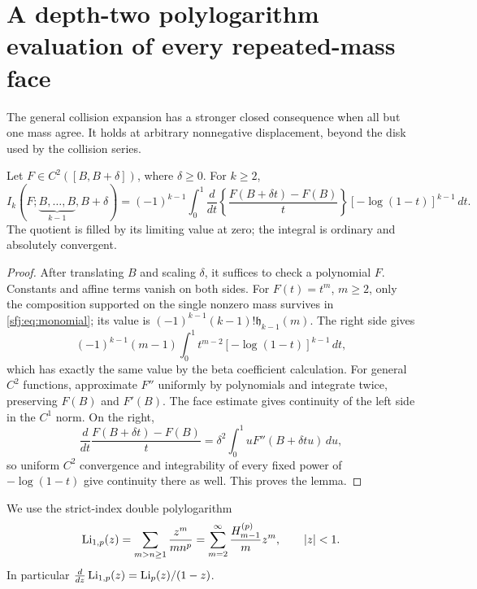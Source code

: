 \section{A depth-two polylogarithm evaluation of every repeated-mass face}
\label{sfj:sec:polylog}

The general collision expansion has a stronger closed consequence when
all but one mass agree.  It holds at arbitrary nonnegative displacement,
beyond the disk used by the collision series.

\begin{lemma}
\label{sfj:lem:repeated}
Let $F\in C^2([B,B+\delta])$, where $\delta\ge0$.  For $k\ge2$,
\begin{equation}\label{sfj:eq:one-dimensional}
 \boxed{\displaystyle
 I_k(F;\underbrace{B,\ldots,B}_{k-1},B+\delta)
  =(-1)^{k-1}\int_0^1
   \frac{d}{dt}\left\{\frac{F(B+\delta t)-F(B)}t\right\}
                            [-\log(1-t)]^{k-1}\,dt.}
\end{equation}
The quotient is filled by its limiting value at zero; the integral is
ordinary and absolutely convergent.
\end{lemma}
\begin{proof}
After translating $B$ and scaling $\delta$, it suffices to check a
polynomial $F$.  Constants and affine terms vanish on both sides.
For $F(t)=t^m$, $m\ge2$, only the composition supported on the single
nonzero mass survives in \eqref{sfj:eq:monomial}; its value is
$(-1)^{k-1}(k-1)!\mathfrak h_{k-1}(m)$.  The right side gives
\[
 (-1)^{k-1}(m-1)\int_0^1
           t^{m-2}[-\log(1-t)]^{k-1}\,dt,
\]
which has exactly the same value by the beta coefficient calculation.
For general $C^2$ functions, approximate $F''$ uniformly by
polynomials and integrate twice, preserving $F(B)$ and $F'(B)$.
The face estimate gives continuity of the left side in the $C^1$
norm.  On the right,
\[
 \frac{d}{dt}\frac{F(B+\delta t)-F(B)}t
       =\delta^2\int_0^1 uF''(B+\delta tu)\,du,
\]
so uniform $C^2$ convergence and integrability of every fixed power of
$-\log(1-t)$ give continuity there as well.  This proves the lemma.
\end{proof}

We use the strict-index double polylogarithm
\begin{equation}\label{sfj:eq:double-polylog}
 \operatorname{Li}_{1,p}(z)=\sum_{m>n\ge1}\frac{z^m}{m n^p}
    =\sum_{m=2}^\infty\frac{H_{m-1}^{(p)}}m z^m,
     \qquad |z|<1.
\end{equation}
In particular
$\frac{d}{dz}\operatorname{Li}_{1,p}(z)=\operatorname{Li}_p(z)/(1-z)$.

